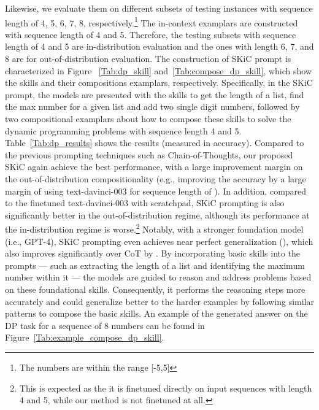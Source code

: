\documentclass{article} \usepackage{arxiv}
\begin{document}
Likewise, we evaluate them on different subsets of testing instances with sequence length of 4, 5, 6, 7, 8, respectively.\footnote{The numbers are within the range [-5,5]} The in-context examplars are constructed with sequence length of 4 and 5. Therefore, the testing subsets with sequence length of 4 and 5 are in-distribution evaluation and the ones with length 6, 7, and 8 are for out-of-distribution evaluation. The construction of SKiC prompt is characterized in Figure ~\ref{Tab:dp_skill} and~\ref{Tab:compose_dp_skill}, which show the skills and their compositions examplars, respectively. Specifically, in the SKiC prompt, the models are presented with the skills to get the length of a list, find the max number for a given list and add two single digit numbers, followed by two compositional examplars about how to compose these skills to solve the dynamic programming problems with sequence length 4 and 5. Table~\ref{Tab:dp_results} shows the results (measured in accuracy). Compared to the previous prompting techniques such as Chain-of-Thoughts, our proposed SKiC again achieve the best performance, with a large improvement margin on the out-of-distribution compositionality (e.g., improving the accuracy by a large margin of  using text-davinci-003 for sequence length of ). In addition, compared to the finetuned text-davinci-003 with scratchpad, SKiC prompting is also significantly better in the out-of-distribution regime, although its performance at the in-distribution regime is worse.\footnote{This is expected as the it is finetuned directly on input sequences with length 4 and 5, while our method is not finetuned at all.} Notably, with a stronger foundation model (i.e., GPT-4), SKiC prompting even achieves near perfect generalization (), which also improves significantly over CoT by . By incorporating basic skills into the prompts --- such as extracting the length of a list and identifying the maximum number within it --- the models are guided to reason and address problems based on these foundational skills. Consequently, it performs the reasoning steps more accurately and could generalize better to the harder examples by following similar patterns to compose the basic skills. An example of the generated answer on the DP task for a sequence of 8 numbers can be found in Figure~\ref{Tab:example_compose_dp_skill}.
\end{document}

